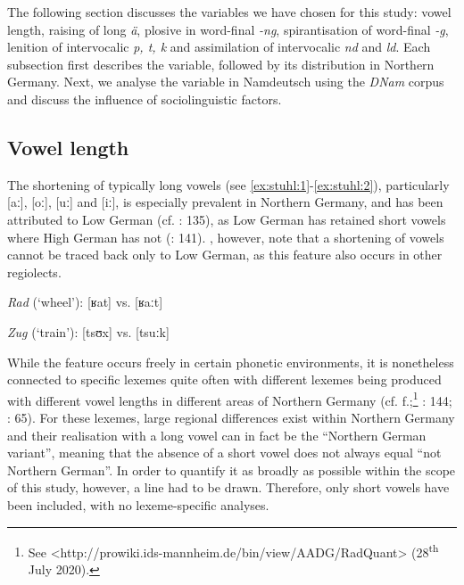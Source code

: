 \documentclass[output=paper]{langsci/langscibook}
\begin{document}
The following section discusses the variables we have chosen for this study: vowel length, raising of long \textit{ä}, plosive in word-final \textit{-ng}, spirantisation of word-final \textit{-g}, lenition of intervocalic \textit{p, t, k} and assimilation of intervocalic \textit{nd} and \textit{ld}. Each subsection first describes the variable, followed by its distribution in Northern Germany. Next, we analyse the variable in Namdeutsch using the \textit{DNam} corpus and discuss the influence of sociolinguistic factors.

\label{sec:stuhl:4}
\subsection{Vowel length}
\label{sec:stuhl:4.1}

The shortening of typically long vowels (see \ref{ex:stuhl:1}-\ref{ex:stuhl:2}), particularly [aː], [oː], [uː] and [iː], is especially prevalent in Northern Germany, and has been attributed to Low German (cf. \citealt{martens_niederdeutsch-bedingte_1988}: 135), as Low German has retained short vowels where High German has not (\citealt{elmentaler_norddeutscher_2015}: 141). \citet[141]{elmentaler_norddeutscher_2015}, however, note that a shortening of vowels cannot be traced back only to Low German, as this feature also occurs in other regiolects.

\ea 
\label{ex:stuhl:1}
\textit{Rad} (‘wheel’): {[ʁat]} vs. {[ʁaːt]} 
 \z
 
\ea 
\label{ex:stuhl:2}
\textit{Zug} (‘train’): {[tsʊx]} vs. {[tsuːk]} 
\z
 
 

While the feature occurs freely in certain phonetic environments, it is nonetheless connected to specific lexemes quite often with different lexemes being produced with different vowel lengths in different areas of Northern Germany (cf. \citealt{kleiner_atlas_2011}f.;\footnote{See <http://prowiki.ids-mannheim.de/bin/view/AADG/RadQuant> (28\textsuperscript{th} July 2020).} \citealt{elmentaler_norddeutscher_2015}: 144; \citealt{kleiner_duden_2015}: 65). For these lexemes, large regional differences exist within Northern Germany and their realisation with a long vowel can in fact be the “Northern German variant”, meaning that the absence of a short vowel does not always equal “not Northern German”. In order to quantify it as broadly as possible within the scope of this study, however, a line had to be drawn. Therefore, only short vowels have been included, with no lexeme-specific analyses.
\end{document}

